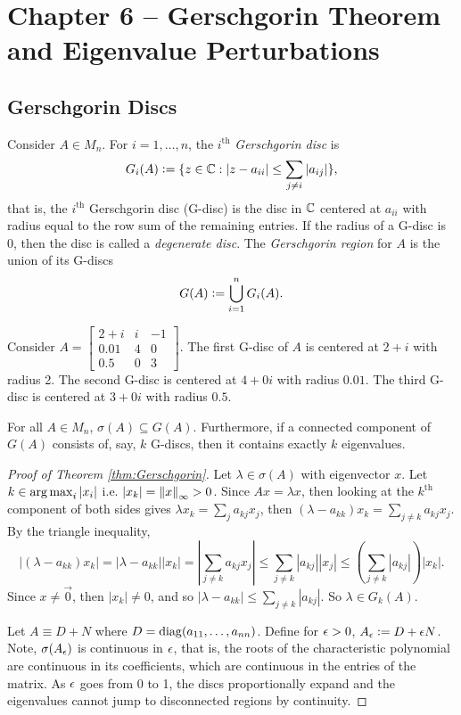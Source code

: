\section{Chapter 6 -- Gerschgorin Theorem and Eigenvalue Perturbations}

\subsection{Gerschgorin Discs}
\begin{definition}
\label{def:Gerschgorin-disc-region}
Consider $A \in M_n$. For $i = 1, \dots, n$, the $i^{\text{th}}$ \textit{Gerschgorin disc} is
\[
    G_i(A) \vcentcolon= \{z \in \mathbb C: |z-a_{ii}| \le \sum_{j\not=i}|a_{ij}|\},
\]
that is, the $i^{\text{th}}$ Gerschgorin disc (G-disc) is the disc in $\mathbb C$ centered at $a_{ii}$ with radius equal to the row sum of the remaining entries. If the radius of a G-disc is 0, then the disc is called a \textit{degenerate disc}. The \textit{Gerschgorin region} for $A$ is the union of its G-discs
\[
    G(A) \vcentcolon= \bigcup_{i=1}^n G_i(A).
\]
\end{definition}

\begin{example}
Consider $A = \begin{bmatrix}2+i & i & -1 \\ 0.01 & 4 & 0 \\ 0.5 & 0 & 3\end{bmatrix}$. The first G-disc of $A$ is centered at $2+i$ with radius 2. The second G-disc is centered at $4+0i$ with radius $0.01$. The third G-disc is centered at $3+0i$ with radius $0.5$.
\end{example}

\begin{theorem}[Gerschgorin]
\label{thm:Gerschgorin}
For all $A \in M_n$, $\sigma(A) \subseteq G(A)$. Furthermore, if a connected component of $G(A)$ consists of, say, $k$ G-discs, then it contains exactly $k$ eigenvalues.
\end{theorem}
\begin{proof}[Proof of Theorem \ref{thm:Gerschgorin}]
Let $\lambda \in \sigma(A)$ with eigenvector $x$. Let $k \in \operatorname*{arg\,max}_i |x_i|$ i.e. $|x_k| = \left\lVert x\right\rVert_\infty > 0$. Since $Ax = \lambda x$, then looking at the $k^\text{th}$ component of both sides gives $\lambda x_k = \sum_j a_{kj}x_j$, then $(\lambda-a_{kk})x_k = \sum_{j\not=k}a_{kj}x_j$. By the triangle inequality,
\[
    |(\lambda - a_{kk})x_k| = |\lambda - a_{kk}||x_k| = \left|\sum_{j\not=k}a_{kj}x_j\right| \le \sum_{j\not=k}|a_{kj}||x_j| \le \left(\sum_{j\not=k}|a_{kj}|\right)|x_k|.
\]
Since $x\not=\Vec{0}$, then $|x_k| \not= 0$, and so $|\lambda-a_{kk}| \le \sum_{j\not=k}|a_{kj}|$. So $\lambda \in G_k(A)$.

Let $A \equiv D + N$ where $D = \operatorname{diag}(a_{11}, \dots, a_{nn})$. Define for $\epsilon>0$, $A_\epsilon \vcentcolon= D+\epsilon N$. Note, $\sigma(A_\epsilon)$ is continuous in $\epsilon$, that is, the roots of the characteristic polynomial are continuous in its coefficients, which are continuous in the entries of the matrix. As $\epsilon$ goes from 0 to 1, the discs proportionally expand and the eigenvalues cannot jump to disconnected regions by continuity.
\end{proof}


